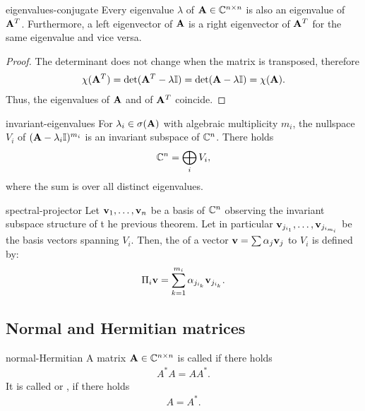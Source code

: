 \begin{Lemma}{eigenvalues-conjugate}
  Every eigenvalue $\lambda$ of $\mathbf A\in\mathbb C^{n\times n}$ is also an
  eigenvalue of $\mathbf A^T$. Furthermore, a left eigenvector of $\mathbf A$
  is a right eigenvector of $\mathbf A^T$ for the same eigenvalue and vice
  versa.
\end{Lemma}

\begin{proof}
  The determinant does not change when the matrix is transposed, therefore
  \begin{gather}
    \chi(\mathbf A^T)
    = \det(\mathbf A^T-\lambda \mathbb I)
    = \det(\mathbf A-\lambda \mathbb I)
    = \chi(\mathbf A).
  \end{gather}
  Thus, the eigenvalues of $\mathbf A$ and of $\mathbf A^T$ coincide.
\end{proof}

\begin{Theorem}{invariant-eigenvalues}
  For $\lambda_i\in \sigma(\mathbf A)$ with algebraic multiplicity $m_i$, the
  nullspace $V_i$ of $(\mathbf A-\lambda_i\mathbb I)^{m_i}$ is an invariant subspace
  of $\mathbb C^n$. There holds
  \begin{gather}
    \mathbb C^n = \bigoplus_{i} V_i,
  \end{gather}
  where the sum is over all distinct eigenvalues.
\end{Theorem}

\begin{Definition}{spectral-projector}
  Let $\mathbf v_1,\dots,\mathbf v_n$ be a basis of $\mathbb C^n$ observing the invariant
  subspace structure of t he previous theorem. Let in particular
  $\mathbf v_{j_{i_1}},\dots,\mathbf v_{j_{i_{m_i}}}$ be the basis vectors spanning
  $V_i$. Then, the  of a vector $\mathbf v = \sum \alpha_j \mathbf v_j$ to
  $V_i$ is defined by:
  \begin{gather}
    \Pi_i \mathbf v = \sum_{k=1}^{m_i} \alpha_{j_{i_k}} \mathbf v_{j_{i_k}}.
  \end{gather}
\end{Definition}

\subsection{Normal and Hermitian matrices}

\begin{Definition}{normal-Hermitian}
  A matrix $\mathbf A\in\mathbb C^{n\times n}$ is called  if there holds
  \begin{gather}
      A^*A = AA^*.
  \end{gather}
  It is called  or , if there holds
  \begin{gather}
      A=A^*.
  \end{gather}
\end{Definition}

